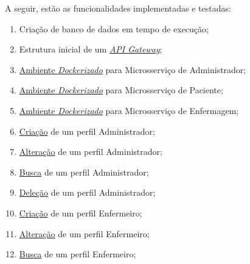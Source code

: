 \begin{apendicesenv}
A seguir, estão as funcionalidades implementadas e testadas:

\begin{enumerate}
    \item Criação de banco de dados em tempo de execução;
    \item Estrutura inicial de um \href{https://github.com/PillWatcher/pillwatcher-api-gateway}{\emph{API Gateway}};
    \item \href{https://github.com/PillWatcher/pillwatcher-dpb-admin-service/blob/master/Dockerfile}{Ambiente \emph{Dockerizado}} para Microsserviço de Administrador;
    \item \href{https://github.com/PillWatcher/pillwatcher-dpb-patient-service/blob/master/Dockerfile}{Ambiente \emph{Dockerizado}} para Microsserviço de Paciente;
    \item \href{https://github.com/PillWatcher/pillwatcher-dpb-nursing-service/blob/master/Dockerfile}{Ambiente \emph{Dockerizado}} para Microsserviço de Enfermagem;
    \item \href{https://github.com/PillWatcher/pillwatcher-dpb-admin-service/blob/master/src/main/java/br/com/pillwatcher/dpb/services/impl/AdminServiceImpl.java#L32}{Criação} de um perfil Administrador;
    \item \href{https://github.com/PillWatcher/pillwatcher-dpb-admin-service/blob/master/src/main/java/br/com/pillwatcher/dpb/services/impl/AdminServiceImpl.java#L50}{Alteração} de um perfil Administrador;
    \item \href{https://github.com/PillWatcher/pillwatcher-dpb-admin-service/blob/master/src/main/java/br/com/pillwatcher/dpb/services/impl/AdminServiceImpl.java#L79}{Busca} de um perfil Administrador;
    \item \href{https://github.com/PillWatcher/pillwatcher-dpb-admin-service/blob/master/src/main/java/br/com/pillwatcher/dpb/services/impl/AdminServiceImpl.java#L96}{Deleção} de um perfil Administrador;
    \item \href{https://github.com/PillWatcher/pillwatcher-dpb-nursing-service/blob/master/src/main/java/br/com/pillwatcher/dpb/services/impl/NurseServiceImpl.java#L29}{Criação} de um perfil Enfermeiro;
    \item \href{https://github.com/PillWatcher/pillwatcher-dpb-nursing-service/blob/master/src/main/java/br/com/pillwatcher/dpb/services/impl/NurseServiceImpl.java#L71}{Alteração} de um perfil Enfermeiro;
    \item \href{https://github.com/PillWatcher/pillwatcher-dpb-nursing-service/blob/master/src/main/java/br/com/pillwatcher/dpb/services/impl/NurseServiceImpl.java#L55}{Busca} de um perfil Enfermeiro;

\end{enumerate}
\end{apendicesenv}

